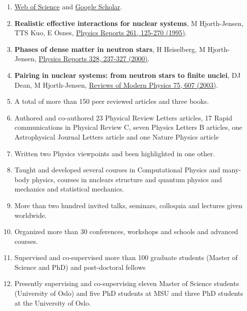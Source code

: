 \documentclass[%
oneside,                 %
final,                   %
10pt]{article}
\begin{document}
\begin{enumerate}
\item \href{{https://publons.com/researcher/1751939/morten-hjorth-jensen/}}{Web of Science} and \href{{https://scholar.google.com/citations?user=nuiyEmwAAAAJ&hl=no}}{Google Scholar}.

\item \textbf{Realistic effective interactions for nuclear systems}, M Hjorth-Jensen, TTS Kuo, E Osnes, \href{{http://www.sciencedirect.com/science/article/pii/0370157395000126}}{Physics Reports 261, 125-270 (1995)}.

\item \textbf{Phases of dense matter in neutron stars}, H Heiselberg, M Hjorth-Jensen, \href{{http://www.sciencedirect.com/science/article/pii/S0370157399001106}}{Physics Reports 328, 237-327 (2000)}.

\item \textbf{Pairing in nuclear systems: from neutron stars to finite nuclei}, DJ Dean, M Hjorth-Jensen, \href{{http://journals.aps.org/rmp/abstract/10.1103/RevModPhys.75.607}}{Reviews of Modern Physics 75, 607  (2003)}.

\item A total of more than 150  peer reviewed articles and three books.

\item Authored and co-authored 23 Physical Review Letters articles, 17 Rapid communications in Physical Review C, seven Physics Letters B articles, one Astrophysical Journal Letters article and one Nature Physics article

\item Written two Physics viewpoints and been highlighted in one other.

\item Taught and developed several courses in Computational Physics and many-body physics, courses in nuclears structure and quantum physics and mechanics and statistical mechanics.

\item More than two hundred invited talks, seminars, colloquia and lectures given worldwide.

\item Organized more than 30 conferences, workshops and schools and advanced courses.

\item Supervised and co-supervised more than 100 graduate students (Master of Science and PhD) and post-doctoral fellows

\item Presently supervising and co-supervising  eleven Master of Science students (University of Oslo) and five PhD students at MSU and three PhD students at the University of Oslo.
\end{enumerate}
\end{document}
